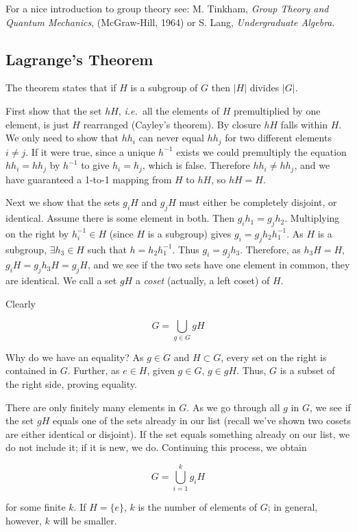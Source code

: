 \documentclass[12pt,letterpaper]{report}
\newcommand\be{\begin{equation}}
\newcommand\ee{\end{equation}}
\newcommand\ie{{\it i.e.\ }}
\begin{document}
For a nice introduction to group theory see: M. Tinkham, {\em
Group Theory and Quantum Mechanics}, (McGraw-Hill, 1964) or S.
Lang, {\em Undergraduate Algebra}.


\subsection{Lagrange's Theorem}

The theorem states that if $H$ is a subgroup of $G$ then $|H|$
divides $|G|$.

First show that the set $hH$, \ie all the elements of $H$
premultiplied by one element, is just $H$ rearranged (Cayley's
theorem). By closure $hH$ falls within $H$. We only need to show
that $h h_i$ can never equal $h h_j$ for two different elements
$i\ne j$. If it were true, since a unique $h^{-1}$ exists we could
premultiply the equation $h h_i = h h_j$ by $h^{-1}$ to give $h_i
= h_j$, which is false. Therefore $h h_i \ne h h_j$, and we have
guaranteed a 1-to-1 mapping from $H$ to $hH$, so $hH = H$.

Next we show that the sets $g_i H$ and $g_j H$ must either be
completely disjoint, or identical. Assume there is some element in
both. Then $g_i h_1 = g_j h_2$. Multiplying on the right by
$h_i^{-1} \in H$ (since $H$ is a subgroup) gives $g_i = g_j h_2
h_1^{-1}$. As $H$ is a subgroup, $\exists h_3 \in H$ such that $h
= h_2 h_1^{-1}$. Thus $g_i = g_j h_3$. Therefore, as $h_3 H = H$,
$g_i H = g_j h_3 H = g_j H$, and we see if the two sets have one
element in common, they are identical. We call a set $gH$ a
\emph{coset} (actually, a left coset) of $H$.

Clearly

\be G = \bigcup_{g \in G} g H \ee

Why do we have an equality? As $g \in G$ and $H \subset G$, every
set on the right is contained in $G$. Further, as $e \in H$, given
$g \in G$, $g \in gH$. Thus, $G$ is a subset of the right side,
proving equality.

There are only finitely many elements in $G$. As we go through all
$g$ in $G$, we see if the set $gH$ equals one of the sets already
in our list (recall we've shown two cosets are either identical or
disjoint). If the set equals something already on our list, we do
not include it; if it is new, we do. Continuing this process, we
obtain

\be G = \bigcup_{i = 1}^k g_i H \ee

for some finite $k$. If $H = \{e\}$, $k$ is the number of elements
of $G$; in general, however, $k$ will be smaller.
\end{document}
